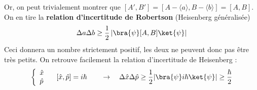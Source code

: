  Or, on peut trivialement montrer que $[A',B'] = [A-\langle a\rangle, B-\langle b\rangle]
 =[A,B]$. On en tire la \textbf{relation d'incertitude de Robertson} (Heisenberg généralisée) 
 \begin{equation}
 \Delta a \Delta b \geq \dfrac{1}{2}\left|\bra{\psi}[A,B]\ket{\psi}\right|
 \end{equation} 
 Ceci donnera un nombre strictement positif, les deux ne peuvent donc pas être très petits. 
 On retrouve facilement la relation d'incertitude de Heisenberg :
 \begin{equation}
 \left\{\begin{array}{ll}
 \hat{x}\\
 \hat{p}
 \end{array}\right.\quad [\hat{x},\hat{p}] = i\hbar\qquad\rightarrow\quad \Delta \hat{x}\Delta
 \hat{p} \geq \dfrac{1}{2}|\bra{\psi}i\hbar\ket{\psi}| \geq \dfrac{\hbar}{2}
 \end{equation}
 
 
 
 
 
 
 
 
 
 
 
 
 
 
 
 
 
 